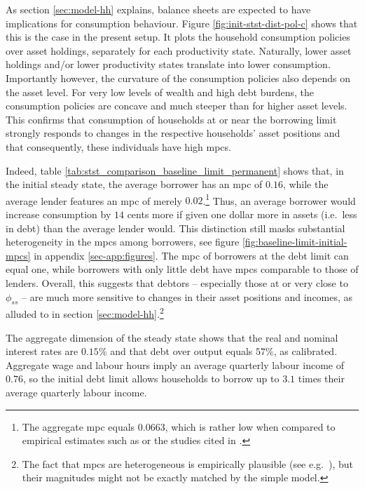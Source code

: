 \documentclass[a4paper,12pt]{article} %
\numberwithin{equation}{section} %
\numberwithin{figure}{section}
\numberwithin{table}{section}
\begin{document}
As section \ref{sec:model-hh} explains, balance sheets are expected to have implications for consumption behaviour. Figure \ref{fig:init-stst-dist-pol-c} shows that this is the case in the present setup. It plots the household consumption policies over asset holdings, separately for each productivity state. Naturally, lower asset holdings and/or lower productivity states translate into lower consumption. Importantly however, the curvature of the consumption policies also depends on the asset level. For very low levels of wealth and high debt burdens, the consumption policies are concave and much steeper than for higher asset levels. This confirms that consumption of households at or near the borrowing limit strongly responds to changes in the respective households' asset positions and that consequently, these individuals have high \Gls{mpc}s.

Indeed, table \ref{tab:stst_comparison_baseline_limit_permanent} shows that, in the initial steady state, the average borrower has an \Gls{mpc} of $0.16$, while the average lender features an \Gls{mpc} of merely $0.02$.\footnote{The aggregate \Gls{mpc} equals $0.0663$, which is rather low when compared to empirical estimates such as \textcite{fagereng2021mpc} or the studies cited in \textcite{kaplan2018}.} Thus, an average borrower would increase consumption by $14$ cents more if given one dollar more in assets (i.e.~less in debt) than the average lender would. This distinction still masks substantial heterogeneity in the \Gls{mpc}s among borrowers, see figure \ref{fig:baseline-limit-initial-mpcs} in appendix \ref{sec-app:figures}. The \Gls{mpc} of borrowers at the debt limit can equal one, while borrowers with only little debt have \Gls{mpc}s comparable to those of lenders. Overall, this suggests that debtors -- especially those at or very close to $\phi_{ss}$ -- are much more sensitive to changes in their asset positions and incomes, as alluded to in section \ref{sec:model-hh}.\footnote{The fact that \Gls{mpc}s are heterogeneous is empirically plausible (see e.g.~\cite{gross2002}), but their magnitudes might not be exactly matched by the simple model.} %

The aggregate dimension of the steady state shows that the real and nominal interest rates are $0.15\%$ and that debt over output equals $57\%$, as calibrated. Aggregate wage and labour hours imply an average quarterly labour income of $0.76$, so the initial debt limit allows households to borrow up to $3.1$ times their average quarterly labour income. 
\end{document}

